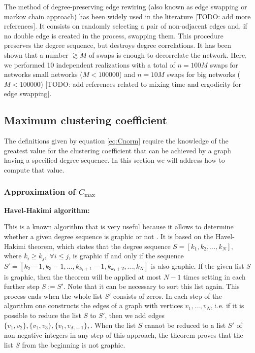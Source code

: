 \documentclass{article}
\begin{document}
The method of degree-preserving edge rewiring (also known as edge swapping or markov chain approach) has been widely used in the literature \cite{Orsini2015QuantifyingNetworks} [TODO: add more references]. It consists on randomly selecting a pair of non-adjacent edges and, if no double edge is created in the process, swapping them. This procedure preserves the degree sequence, but destroys degree correlations. It has been shown that a number $\gtrsim M$ of swaps is enough to decorrelate the network. Here, we performed 10 independent realizations with a total of $n = 100 M$ swaps for networks small networks ($M < 100000$) and  $n = 10 M$ swaps for big networks ($M < 100000$) [TODO: add references related to mixing time and ergodicity for edge swapping]. 

\subsection{Maximum clustering coefficient}

The definitions given by equation \ref{eq:Cnorm} require the knowledge of the greatest value for the clustering coefficient that can be achieved by a graph having a specified degree sequence. In this section we will address how to compute that value.

\subsubsection{Approximation of $C_{\mathrm{max}}$}

{\bf Havel-Hakimi algorithm:}

This is a known algorithm that is very useful because it allows to determine whether a given degree sequence is graphic or not \cite{Hakimi1962}. It is based on the Havel-Hakimi theorem, which states that the degree sequence $S = [k_1, k_2, ..., k_N]$, where $k_i \geq k_j,\; \forall i\leq j$, is graphic if and only if the sequence $S' = [k_2-1, k_3-1, ..., k_{k_1+1}-1, k_{k_1+2} ,..., k_N]$ is also graphic. If the given list $S$ is graphic, then the theorem will be applied at most $N-1$ times setting in each further step $S:=S'$. Note that it can be necessary to sort this list again. This process ends when the whole list $S'$ consists of zeros. In each step of the algorithm one constructs the edges of a graph with vertices $v_1, ..., v_N$, i.e. if it is possible to reduce the list $S$ to $S'$, then we add edges $\lbrace v_1, v_2 \rbrace, \lbrace v_1, v_3 \rbrace, \lbrace v_1, v_{d_1+1} \rbrace,$. When the list $S$ cannot be reduced to a list $S'$ of non-negative integers in any step of this approach, the theorem proves that the list $S$ from the beginning is not graphic.
\end{document}
